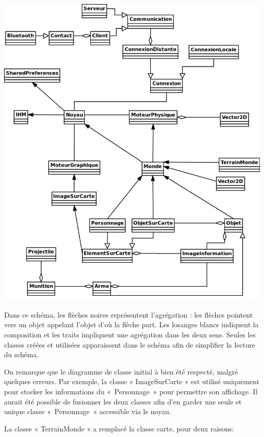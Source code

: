 \documentclass{report}
\begin{document}
\includegraphics[scale=0.5]{images/graph5}

Dans ce schéma, les flèches noires représentent l’agrégation : les
flèches pointent vers un objet appelant l’objet d’où la flèche part.
Les losanges blancs indiquent la composition et les traits impliquent
une agrégation dans les deux sens. Seules les classes créées et utilisées
apparaissent dans le schéma afin de simplifier la lecture du schéma.

On remarque que le diagramme de classe initial à bien été respecté,
malgré quelques erreurs. Par exemple, la classe « ImageSurCarte » est
utilisé uniquement pour stocker les informations du «~Personnage~» pour
permettre son affichage. Il aurait été possible de fusionner les deux
classes afin d’en garder une seule et unique classe «~Personnage~»
accessible via le noyau.

La classe « TerrainMonde » a remplacé la classe carte, pour deux
raisons:
\end{document}
